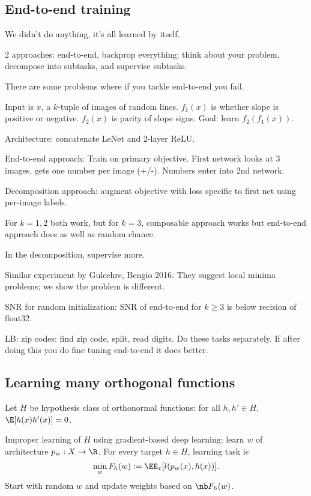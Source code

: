 \subsection{End-to-end training}

We didn't do anything, it's all learned by itself.

2 approaches: end-to-end, backprop everything; think about your problem, decompose into subtasks, and supervise subtasks.

There are some problems where if you tackle end-to-end you fail.

Input is $x$, a $k$-tuple of  images of random lines.
$f_1(x)$ is whether slope is positive or negative.
$f_2(x)$ is parity of slope signs. Goal: learn $f_2(f_1(x))$.

Architecture: concatenate LeNet and 2-layer ReLU. 

End-to-end approach: Train on primary objective. First network looks at 3 images, gets one number per image (+/-). Numbers enter into 2nd network.

Decomposition approach: augment objective with loss specific to first net using per-image labels.

For $k=1,2$ both work, but for $k=3$, composable approach works but end-to-end approach does as well as random chance.

%
In the decomposition, supervise more.


Similar experiment by Gulcehre, Bengio 2016. They suggest local minima problems; we show the problem is different.

SNR for random initialization: SNR of end-to-end for $k\ge 3$ is below recision of float32.

LB: zip codes: find zip code, split, read digits. Do these tasks separately. If after doing this you do fine tuning end-to-end it does better.

\subsection{Learning many orthogonal functions}

Let $H$ be hypothesis class of orthonormal functions: for all $h,h'\in H$, $\E[h(x)h'(x)]=0$. 

Improper learning of $H$ using gradient-based deep learning: learn $w$ of architecture $p_w:X\to \R$. For every target $h\in H$, learning task is
$$
\min_w F_h(w) :=\EE_x[l(p_w(x),h(x))].
$$
Start with random $w$ and update weights based on $\nb F_h(w)$.

